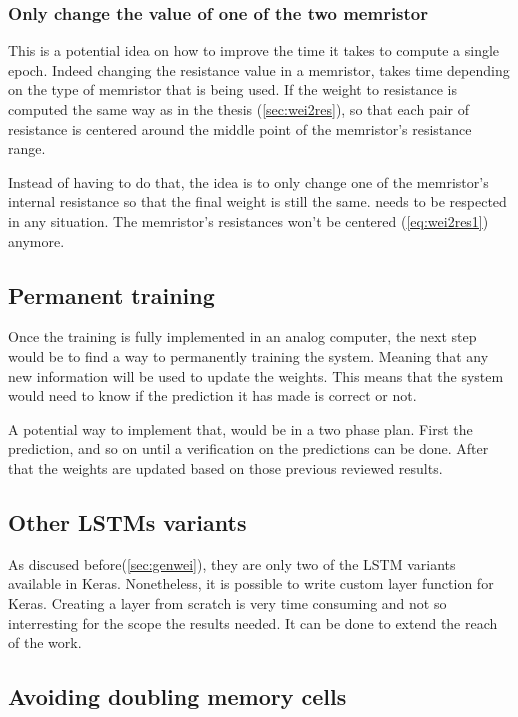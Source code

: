 \subsubsection{Only change the value of one of the two memristor}

This is a potential idea on how to improve the time it takes to compute a single epoch. Indeed changing the resistance value in a memristor, takes time depending on the type of memristor that is being used. If the weight to resistance is computed the same way as in the thesis (\cref{sec:wei2res}), so that each pair of resistance is centered around the middle point of the memristor's resistance range.

Instead of having to do that, the idea is to only change one of the memristor's internal resistance so that the final weight is still the same.  needs to be respected in any situation. The memristor's resistances won't be centered (\cref{eq:wei2res1}) anymore.

\subsection{Permanent training}

Once the training is fully implemented in an analog computer, the next step would be to find a way to permanently training the system. Meaning that any new information will be used to update the weights. This means that the system would need to know if the prediction it has made is correct or not.

A potential way to implement that, would be in a two phase plan. First the prediction, and so on until a verification on the predictions can be done. After that the weights are updated based on those previous reviewed results.

\subsection{Other \acp{LSTM} variants}

As discused before(\cref{sec:genwei}), they are only two of the \ac{LSTM} variants available in Keras. Nonetheless, it is possible to write custom layer function for Keras. Creating a layer from scratch is very time consuming and not so interresting for the scope the results needed. It can be done to extend the reach of the work.

\subsection{Avoiding doubling memory cells}\label{subsec:noDoubleMemcell}

